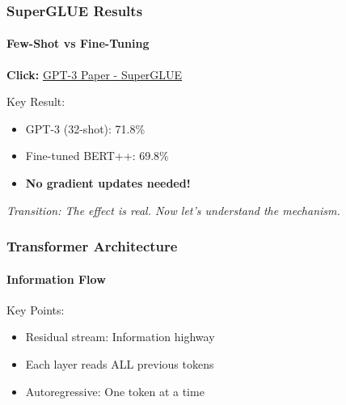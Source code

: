 \documentclass[10pt,aspectratio=169]{beamer}
\begin{document}
\begin{frame}
\frametitle{SuperGLUE Results}
\framesubtitle{Few-Shot vs Fine-Tuning}

\begin{center}
\Large
\textbf{Click:} \href{run:./papers/2005.14165_gpt3_language_models_few_shot.pdf}{\color{blue}GPT-3 Paper - SuperGLUE}
\end{center}

\vspace{1cm}

Key Result:
\begin{itemize}
    \item GPT-3 (32-shot): 71.8\%
    \item Fine-tuned BERT++: 69.8\%
    \item \textbf{No gradient updates needed!}
\end{itemize}

\vspace{1cm}
\textit{Transition: The effect is real. Now let's understand the mechanism.}
\end{frame}


\begin{frame}
\frametitle{Transformer Architecture}
\framesubtitle{Information Flow}

\begin{center}
\end{center}

\vspace{0.5cm}
Key Points:
\begin{itemize}
    \item Residual stream: Information highway
    \item Each layer reads ALL previous tokens
    \item Autoregressive: One token at a time
\end{itemize}
\end{frame}
\end{document}
